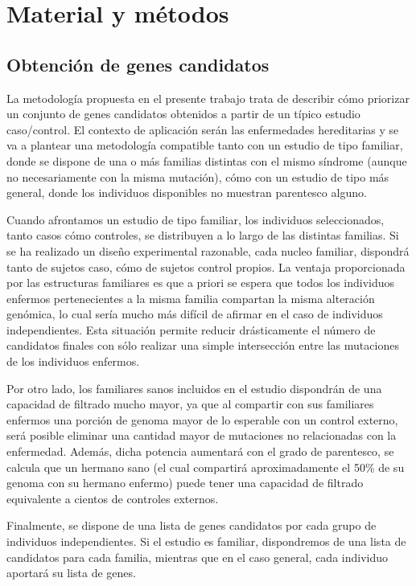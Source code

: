 \chapter{Material y métodos}


\section{Obtención de genes candidatos}

La metodología propuesta en el presente trabajo trata de describir cómo priorizar un conjunto de genes candidatos obtenidos a partir de un típico estudio caso/control. El contexto de aplicación serán las enfermedades hereditarias y se va a plantear una metodología compatible tanto con un estudio de tipo familiar, donde se dispone de una o más familias distintas con el mismo síndrome (aunque no necesariamente con la misma mutación), cómo con un estudio de tipo más general, donde los individuos disponibles no muestran parentesco alguno. 

\medskip
Cuando afrontamos un estudio de tipo familiar, los individuos seleccionados, tanto casos cómo controles, se distribuyen a lo largo de las distintas familias. Si se ha realizado un diseño experimental razonable, cada nucleo familiar, dispondrá tanto de sujetos caso, cómo de sujetos control propios. La ventaja proporcionada por las estructuras familiares es que a priori se espera que todos los individuos enfermos pertenecientes a la misma familia compartan la misma alteración genómica, lo cual sería mucho más difícil de afirmar en el caso de individuos independientes. Esta situación permite reducir drásticamente el número de candidatos finales con sólo realizar una simple intersección entre las mutaciones de los individuos enfermos. 

\medskip
Por otro lado, los familiares sanos incluidos en el estudio dispondrán de una capacidad de filtrado mucho mayor, ya que al compartir con sus familiares enfermos una porción de genoma mayor de lo esperable con un control externo, será posible eliminar una cantidad mayor de mutaciones no relacionadas con la enfermedad. Además, dicha potencia aumentará con el grado de parentesco, se calcula que un hermano sano (el cual compartirá aproximadamente el 50\% de su genoma con su hermano enfermo) puede tener una capacidad de filtrado equivalente a cientos de controles externos.

\medskip 
Finalmente, se dispone de una lista de genes candidatos por cada grupo de individuos independientes. Si el estudio es familiar, dispondremos de una lista de candidatos para cada familia, mientras que en el caso general, cada individuo aportará su lista de genes.

